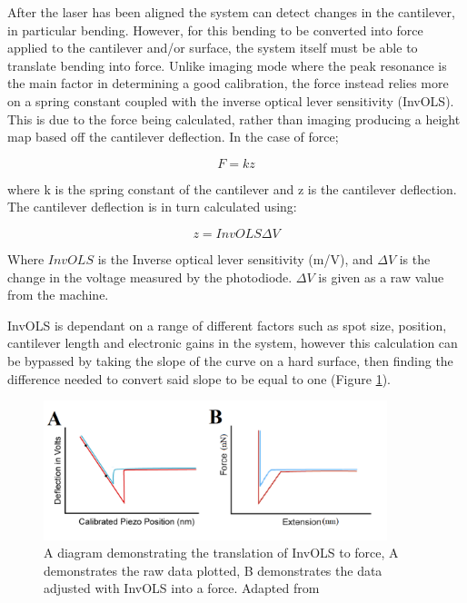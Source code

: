 After the laser has been aligned the system can detect changes in the cantilever, in particular bending. However, for this bending to be converted into force applied to the cantilever and/or surface, the system itself must be able to translate bending into force. Unlike imaging mode where the peak resonance is the main factor in determining a good calibration, the force instead relies more on a spring constant coupled with the inverse optical lever sensitivity (InvOLS). This is due to the force being calculated, rather than imaging producing a height map based off the cantilever deflection. In the case of force; 

\begin{equation}
F = kz
\end{equation}

where k is the spring constant of the cantilever and z is the cantilever deflection. The cantilever deflection is in turn calculated using:

\begin{equation}
z = InvOLS\Delta V
\end{equation}

Where $InvOLS$ is the Inverse optical lever sensitivity (m/V), and $\Delta V$ is the change in the voltage measured by the photodiode. $\Delta V$ is given as a raw value from the machine.

InvOLS is dependant on a range of different factors such as spot size, position, cantilever length and electronic gains in the system, however this calculation can be bypassed by taking the slope of the curve on a hard surface, then finding the difference needed to convert said slope to be equal to one (Figure \ref{fig:InvOLS}). 

\begin{figure}[h!]     %
        \begin{center}
          \includegraphics[width=100mm]{chapter2/InvOLS.png}
\end{center}
\caption{A diagram demonstrating the translation of InvOLS to force, A demonstrates the raw data plotted, B demonstrates the data adjusted with InvOLS into a force. Adapted from \cite{AFMTalk}}
\label{fig:InvOLS}                 %
\end{figure}

